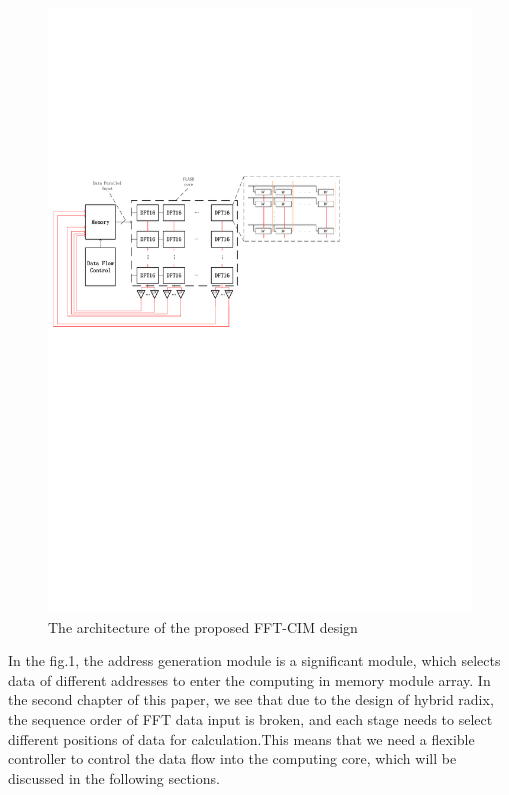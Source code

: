 \documentclass[journal]{IEEEtran}
\begin{document}
\begin{figure}[h]
\centering
\includegraphics[scale=0.3]{figures/figure1}
\caption{The architecture of the proposed FFT-CIM design}
\end{figure}

In the fig.1, the address generation module is a significant module, which selects data of different addresses to enter the computing in memory module array. In the second chapter of this paper, we see that due to the design of hybrid radix, the sequence order of FFT data input is broken, and each stage needs to select different positions of data for calculation.This means that we need a flexible controller to control the data flow into the computing core, which will be discussed in the following sections.
\end{document}
